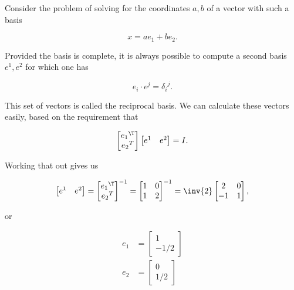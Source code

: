 \documentclass[iop,onecolumn]{emulateapj}
\begin{document}
Consider the problem of solving for the coordinates $a,b$ of a vector with such a basis

\begin{equation}\label{eqn:grahamSchmidtLorentz:110}
x = a e_1 + b e_2.
\end{equation}

Provided the basis is complete, it is always possible to compute a second basis ${e^1, e^2}$ for which one has

\begin{equation}\label{eqn:grahamSchmidtLorentz:130}
e_i \cdot e^j = {\delta_i}^j.
\end{equation}

This set of vectors is called the reciprocal basis.  We can calculate these vectors easily, based on the requirement that

\begin{equation}\label{eqn:grahamSchmidtLorentz:150}
\begin{bmatrix}
{e_1}^\T \\
{e_2}^T
\end{bmatrix}
\begin{bmatrix}
e^1 & e^2
\end{bmatrix} = I.
\end{equation}

Working that out gives us

\begin{equation}\label{eqn:grahamSchmidtLorentz:170}
\begin{bmatrix}
e^1 & e^2
\end{bmatrix}
=
{
\begin{bmatrix}
{e_1}^\T \\
{e_2}^T
\end{bmatrix}
}^{-1}
=
{\begin{bmatrix}
1 & 0 \\
1 & 2
\end{bmatrix}}^{-1}
=
\inv{2}
\begin{bmatrix}
2 & 0 \\
-1 & 1
\end{bmatrix},
\end{equation}

or

\begin{equation}\label{eqn:grahamSchmidtLorentz:190}
\begin{aligned}
e_1 &=
\begin{bmatrix}
1 \\
-1/2
\end{bmatrix} \\
e_2 &=
\begin{bmatrix}
0 \\
1/2
\end{bmatrix}
\end{aligned}
\end{equation}
\end{document}
